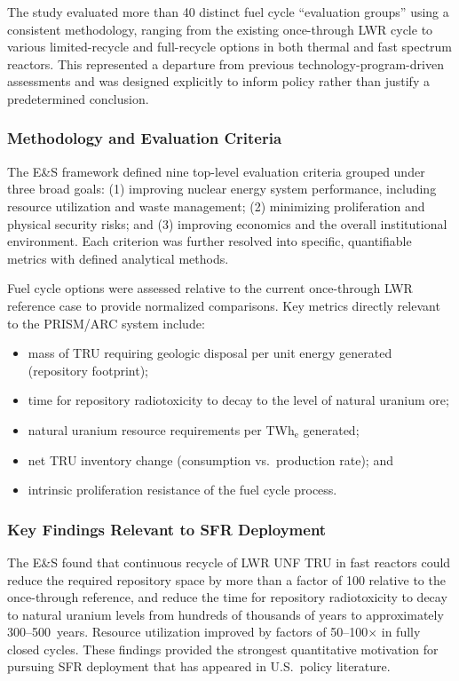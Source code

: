 \documentclass[10pt,twoside]{article}
\begin{document}
The study evaluated more than 40 distinct fuel cycle ``evaluation groups''
using a consistent methodology, ranging from the existing once-through LWR
cycle to various limited-recycle and full-recycle options in both thermal and
fast spectrum reactors.  This represented a departure from previous
technology-program-driven assessments and was designed explicitly to inform
policy rather than justify a predetermined conclusion.

\subsubsection{Methodology and Evaluation Criteria}

The E\&S framework defined nine top-level evaluation criteria grouped under
three broad goals: (1) improving nuclear energy system performance, including
resource utilization and waste management; (2) minimizing proliferation and
physical security risks; and (3) improving economics and the overall
institutional environment.  Each criterion was further resolved into specific,
quantifiable metrics with defined analytical methods.

Fuel cycle options were assessed relative to the current once-through LWR
reference case to provide normalized comparisons.  Key metrics directly
relevant to the PRISM/ARC system include:
\begin{itemize}
  \item mass of TRU requiring geologic disposal per unit energy generated
        (repository footprint);
  \item time for repository radiotoxicity to decay to the level of natural
        uranium ore;
  \item natural uranium resource requirements per TWh$_\text{e}$ generated;
  \item net TRU inventory change (consumption vs.\ production rate); and
  \item intrinsic proliferation resistance of the fuel cycle process.
\end{itemize}

\subsubsection{Key Findings Relevant to SFR Deployment}

The E\&S found that continuous recycle of LWR UNF TRU in fast reactors
could reduce the required repository space by more than a factor of 100
relative to the once-through reference, and reduce the time for repository
radiotoxicity to decay to natural uranium levels from hundreds of thousands
of years to approximately 300--500~years.\cite{DOE_ES_2014}  Resource
utilization improved by factors of 50--100$\times$ in fully closed cycles.
These findings provided the strongest quantitative motivation for pursuing
SFR deployment that has appeared in U.S.\ policy literature.
\end{document}
